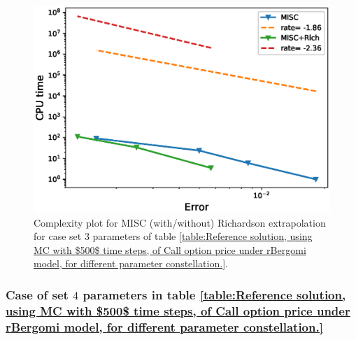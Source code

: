 	\begin{figure}[h!]
	\centering
	\includegraphics[width=0.5\linewidth]{./figures/rBergomi_Complexity_rates/set5/error_vs_time_set5_comparison}
	
	\caption{Complexity plot for  MISC (with/without) Richardson extrapolation for case set $3$ parameters of table \ref{table:Reference solution, using MC with $500$ time steps, of Call option price under rBergomi model, for different parameter constellation.}.}
	\label{fig:Complexity plot for  MISC for case set $3$ parameters, comparison}
\end{figure}







\FloatBarrier
\subsubsection{Case of set $4$ parameters in table \ref{table:Reference solution, using MC with $500$ time steps, of Call option price under rBergomi model, for different parameter constellation.}}\label{sec:Case of set 4 parameters}

